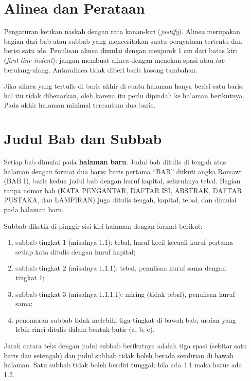 \section{Alinea dan Perataan}
Pengaturan ketikan naskah dengan rata kanan-kiri (\textit{justify}). Alinea merupakan bagian dari bab atau subbab yang menceritakan suatu pernyataan tertentu dan berisi satu ide. Penulisan alinea dimulai dengan menjorok 1 cm dari batas kiri (\textit{first line indent}); jangan membuat alinea dengan menekan spasi atau \textit{tab} berulang-ulang. Antaralinea tidak diberi baris kosong tambahan.

Jika alinea yang tertulis di baris akhir di suatu halaman hanya berisi satu baris, hal itu tidak dibenarkan, oleh karena itu perlu dipindah ke halaman berikutnya. Pada akhir halaman minimal tercantum dua baris.

\section{Judul Bab dan Subbab}
Setiap bab dimulai pada \textbf{halaman baru}. Judul bab ditulis di tengah atas halaman dengan format dua baris: baris pertama “BAB” diikuti angka Romawi (BAB I), baris kedua judul bab dengan huruf kapital, seluruhnya tebal. Bagian tanpa nomor bab (KATA PENGANTAR, DAFTAR ISI, ABSTRAK, DAFTAR PUSTAKA, dan LAMPIRAN) juga ditulis tengah, kapital, tebal, dan dimulai pada halaman baru.

Subbab diketik di pinggir sisi kiri halaman dengan format berikut:
\begin{enumerate}
\item subbab tingkat 1 (misalnya 1.1): tebal, huruf kecil kecuali huruf pertama setiap kata ditulis dengan huruf kapital;
\item subbab tingkat 2 (misalnya 1.1.1): tebal, penulisan huruf sama dengan tingkat 1;
\item subbab tingkat 3 (misalnya 1.1.1.1): miring (tidak tebal), penulisan huruf sama;
\item penomoran subbab tidak melebihi tiga tingkat di bawah bab; uraian yang lebih rinci ditulis dalam bentuk butir (a, b, c).
\end{enumerate}
Jarak antara teks dengan judul subbab berikutnya adalah tiga spasi (sekitar satu baris dan setengah) dan judul subbab tidak boleh berada sendirian di bawah halaman. Satu subbab tidak boleh berdiri tunggal; bila ada 1.1 maka harus ada 1.2.

